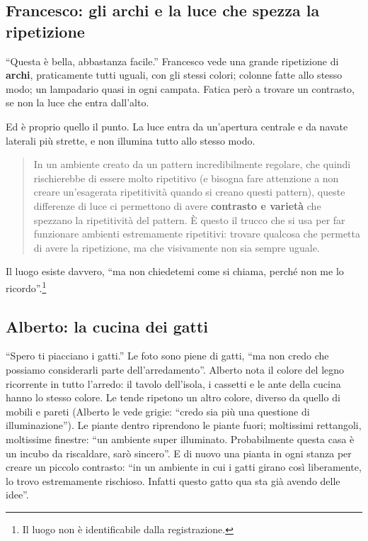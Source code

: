 \subsection{Francesco: gli archi e la luce che spezza la ripetizione}
\label{gd17:sec:archi}

``Questa è bella, abbastanza facile.'' Francesco vede una grande ripetizione di
\textbf{archi}, praticamente tutti uguali, con gli stessi colori; colonne fatte allo
stesso modo; un lampadario quasi in ogni campata. Fatica però a trovare un contrasto, se
non la luce che entra dall'alto.

Ed è proprio quello il punto. La luce entra da un'apertura centrale e da navate laterali
più strette, e non illumina tutto allo stesso modo.
\begin{quote}
In un ambiente creato da un pattern incredibilmente regolare, che quindi rischierebbe di
essere molto ripetitivo (e bisogna fare attenzione a non creare un'esagerata ripetitività
quando si creano questi pattern), queste differenze di luce ci permettono di avere
\textbf{contrasto e varietà} che spezzano la ripetitività del pattern. È questo il
trucco che si usa per far funzionare ambienti estremamente ripetitivi: trovare qualcosa
che permetta di avere la ripetizione, ma che visivamente non sia sempre uguale.
\end{quote}
Il luogo esiste davvero, ``ma non chiedetemi come si chiama, perché non me lo
ricordo''.\footnote{Il luogo non è identificabile dalla registrazione.}

\subsection{Alberto: la cucina dei gatti}

``Spero ti piacciano i gatti.'' Le foto sono piene di gatti, ``ma non credo che possiamo
considerarli parte dell'arredamento''. Alberto nota il colore del legno ricorrente in
tutto l'arredo: il tavolo dell'isola, i cassetti e le ante della cucina hanno lo stesso
colore. Le tende ripetono un altro colore, diverso da quello di mobili e pareti (Alberto
le vede grigie: ``credo sia più una questione di illuminazione''). Le piante dentro
riprendono le piante fuori; moltissimi rettangoli, moltissime finestre: ``un ambiente
super illuminato. Probabilmente questa casa è un incubo da riscaldare, sarò sincero''. E
di nuovo una pianta in ogni stanza per creare un piccolo contrasto: ``in un ambiente in
cui i gatti girano così liberamente, lo trovo estremamente rischioso. Infatti questo
gatto qua sta già avendo delle idee''.

